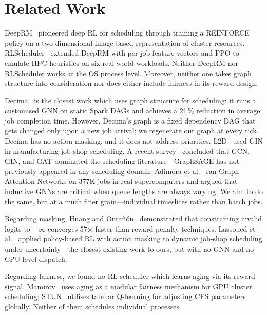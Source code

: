 \documentclass[conference]{IEEEtran}
\begin{document}
\section{Related Work}

DeepRM~\cite{mao2016deeprm} pioneered deep RL for scheduling through
training a REINFORCE policy on a two-dimensional image-based representation
of cluster resources. RLScheduler~\cite{zhang2020rlscheduler} extended
DeepRM with per-job feature vectors and PPO to emulate HPC heuristics on
six real-world workloads. Neither DeepRM nor RLScheduler works at the OS
process level. Moreover, neither one takes graph structure into
consideration nor does either include fairness in its reward design.

Decima~\cite{mao2019decima} is the closest work which uses graph structure
for scheduling: it runs a customised GNN on static Spark DAGs and achieves a
21\,\% reduction in average job completion time. However, Decima's graph is
a fixed dependency DAG that gets changed only upon a new job arrival; we
regenerate our graph at every tick. Decima has no action masking, and it does
not address priorities. L2D~\cite{zhang2020l2d} used GIN in manufacturing
job-shop scheduling. A recent survey~\cite{echeverria2024gnnreview}
concluded that GCN, GIN, and GAT dominated the scheduling
literature---GraphSAGE has not previously appeared in any scheduling domain.
Adimora et al.~\cite{adimora2024hpc} ran Graph Attention Networks on 377K
jobs in real supercomputers and argued that inductive GNNs are critical when
queue lengths are always varying. We aim to do the same, but at a much finer
grain---individual timeslices rather than batch jobs.

Regarding masking, Huang and Onta\~n\'on~\cite{huang2022masking}
demonstrated that constraining invalid logits to $-\infty$ converges
57$\times$ faster than reward penalty techniques. Lassoued et
al.~\cite{lassoued2026maskable} applied policy-based RL with action
masking to dynamic job-shop scheduling under uncertainty---the closest
existing work to ours, but with no GNN and no CPU-level dispatch.

Regarding fairness, we found no RL scheduler which learns aging via its
reward signal. Mamirov~\cite{mamirov2025gpuaging} uses aging as a modular
fairness mechanism for GPU cluster scheduling; STUN~\cite{lee2022stun} utilises tabular Q-learning for
adjusting CFS parameters globally. Neither of them schedules individual
processes.
\end{document}
